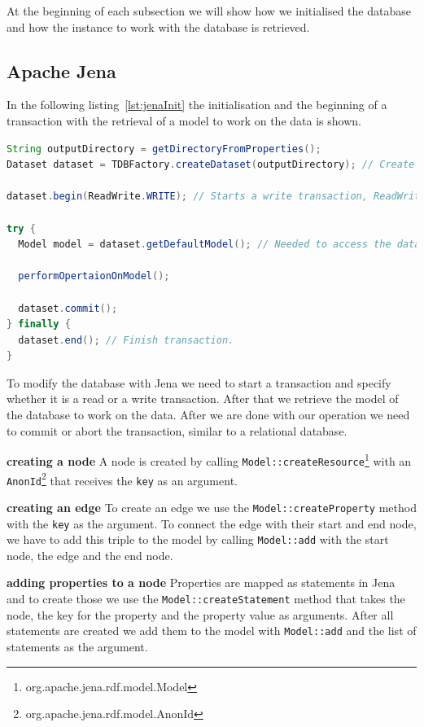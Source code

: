 At the beginning of each subsection we will show how we initialised the database and how the instance to work with the database is retrieved.

\subsection{Apache Jena}
In the following listing~\ref{lst:jenaInit} the initialisation and the beginning of a transaction with the retrieval of a model to work on the data is shown.

\begin{lstlisting}[language=Java,label={lst:jenaInit},caption={Implementation of the initialisation and model retrieval in Jena.},captionpos=b]
String outputDirectory = getDirectoryFromProperties();
Dataset dataset = TDBFactory.createDataset(outputDirectory); // Create dataset, represents the database.

dataset.begin(ReadWrite.WRITE); // Starts a write transaction, ReadWrite.READ is used for read operations.

try {
  Model model = dataset.getDefaultModel(); // Needed to access the database.

  performOpertaionOnModel();

  dataset.commit();
} finally {
  dataset.end(); // Finish transaction.
}
\end{lstlisting}

To modify the database with Jena we need to start a transaction and specify whether it is a read or a write transaction.
After that we retrieve the model of the database to work on the data.
After we are done with our operation we need to commit or abort the transaction,
similar to a relational database.

\textbf{creating a node} \newline
A node is created by calling \texttt{Model::createResource}\footnote{org.apache.jena.rdf.model.Model} with an \texttt{AnonId}\footnote{org.apache.jena.rdf.model.AnonId} that receives the \texttt{key} as an argument.

\textbf{creating an edge} \newline
To create an edge we use the \texttt{Model::createProperty} method with the \texttt{key} as the argument.
To connect the edge with their start and end node,
we have to add this triple to the model by calling \texttt{Model::add} with the start node,
the edge and the end node.

\textbf{adding properties to a node} \newline
Properties are mapped as statements in Jena and to create those we use the
\texttt{Model::\allowbreak createStatement} method that takes the node, the key for the property and the property value as arguments.
After all statements are created we add them to the model with \texttt{Model::add} and the list of statements as the argument.

